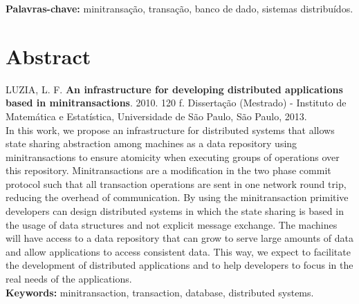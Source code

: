 \documentclass[11pt,twoside,a4paper]{book}
\begin{document}
\noindent \textbf{Palavras-chave:} minitransação, transação, banco de dado, sistemas distribuídos.

\chapter*{Abstract}
\noindent LUZIA, L. F. \textbf{An infrastructure for developing distributed applications based in minitransactions}. 
2010. 120 f.
Dissertação (Mestrado) - Instituto de Matemática e Estatística,
Universidade de São Paulo, São Paulo, 2013.
\\

In this work, we propose an infrastructure for distributed systems that allows
state sharing abstraction among machines as a data repository using minitransactions to ensure atomicity when executing groups of operations over 
this repository. Minitransactions are a modification in the two phase 
commit protocol such that all transaction operations are sent in one network round trip, reducing the overhead of communication. By using the 
minitransaction primitive developers can design distributed systems in which the state sharing is based in the usage of data structures and not 
explicit message exchange. The machines will have access to a data repository that can grow to serve large amounts of data and allow applications 
to access consistent data. This way, we expect to facilitate the development of
distributed applications and to help developers to focus in the real needs of
the applications.
\\

\noindent \textbf{Keywords:} minitransaction, transaction, database, distributed systems.

\tableofcontents

\end{document}
